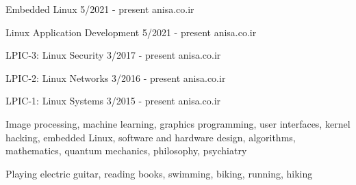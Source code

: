 \documentclass[a4paper,12pt]{memoir} %
\begin{document}
{Embedded Linux}
{5/2021 - present}
{}
{anisa.co.ir}


{Linux Application Development}
{5/2021 - present}
{}
{anisa.co.ir}


{LPIC-3: Linux Security}
{3/2017 - present}
{}
{anisa.co.ir}


{LPIC-2: Linux Networks}
{3/2016 - present}
{}
{anisa.co.ir}


{LPIC-1: Linux Systems}
{3/2015 - present}
{}
{anisa.co.ir}


\Sep %




{Image processing, machine learning, graphics programming, user interfaces, kernel hacking, embedded Linux, software and hardware design, algorithms, mathematics, quantum mechanics, philosophy, psychiatry}


{Playing electric guitar, reading books, swimming, biking, running, hiking}


\Sep %


\end{document}
